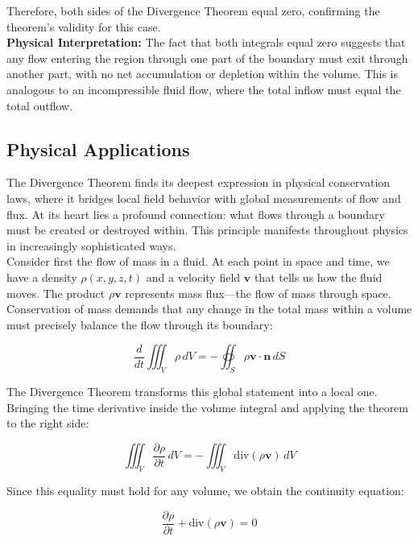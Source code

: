 \begin{example}
\begin{solution}
\noindent Therefore, both sides of the Divergence Theorem equal zero, confirming the theorem's validity for this case. \\

\noindent \textbf{Physical Interpretation:} The fact that both integrals equal zero suggests that any flow entering the region through one part of the boundary must exit through another part, with no net accumulation or depletion within the volume. This is analogous to an incompressible fluid flow, where the total inflow must equal the total outflow.
\end{solution}
\end{example}
\exampleline

\subsection*{Physical Applications} 

\noindent The Divergence Theorem finds its deepest expression in physical conservation laws, where it bridges local field behavior with global measurements of flow and flux. At its heart lies a profound connection: what flows through a boundary must be created or destroyed within. This principle manifests throughout physics in increasingly sophisticated ways. \\

\noindent Consider first the flow of mass in a fluid. At each point in space and time, we have a density $\rho(x,y,z,t)$ and a velocity field $\mathbf{v}$ that tells us how the fluid moves. The product $\rho\mathbf{v}$ represents mass flux—the flow of mass through space. Conservation of mass demands that any change in the total mass within a volume must precisely balance the flow through its boundary:

\[
\frac{d}{dt}\iiint_V \rho\,dV = -\oiint_S \rho\mathbf{v} \cdot \mathbf{n}\,dS
\]

\noindent The Divergence Theorem transforms this global statement into a local one. Bringing the time derivative inside the volume integral and applying the theorem to the right side:

\[
\iiint_V \frac{\partial \rho}{\partial t}\,dV = -\iiint_V \text{div}(\rho\mathbf{v})\,dV
\]

\noindent Since this equality must hold for any volume, we obtain the continuity equation:

\[
\frac{\partial \rho}{\partial t} + \text{div}(\rho\mathbf{v}) = 0
\]

